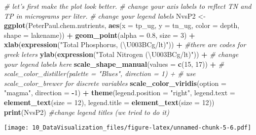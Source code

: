 \documentclass[]{article}
\newenvironment{Shaded}{\begin{snugshade}}{\end{snugshade}}
\newcommand{\KeywordTok}[1]{\textcolor[rgb]{0.13,0.29,0.53}{\textbf{#1}}}
\newcommand{\DataTypeTok}[1]{\textcolor[rgb]{0.13,0.29,0.53}{#1}}
\newcommand{\DecValTok}[1]{\textcolor[rgb]{0.00,0.00,0.81}{#1}}
\newcommand{\FloatTok}[1]{\textcolor[rgb]{0.00,0.00,0.81}{#1}}
\newcommand{\StringTok}[1]{\textcolor[rgb]{0.31,0.60,0.02}{#1}}
\newcommand{\CommentTok}[1]{\textcolor[rgb]{0.56,0.35,0.01}{\textit{#1}}}
\newcommand{\OperatorTok}[1]{\textcolor[rgb]{0.81,0.36,0.00}{\textbf{#1}}}
\newcommand{\NormalTok}[1]{#1}
\begin{document}
\begin{Shaded}
\begin{Highlighting}[]
\CommentTok{# let's first make the plot look better.}
\CommentTok{# change your axis labels to reflect TN and TP in micrograms per liter.}
\CommentTok{# change your legend labels}
\NormalTok{NvsP2 <-}
\StringTok{  }\KeywordTok{ggplot}\NormalTok{(PeterPaul.chem.nutrients, }\KeywordTok{aes}\NormalTok{(}\DataTypeTok{x =}\NormalTok{ tp_ug, }\DataTypeTok{y =}\NormalTok{ tn_ug, }\DataTypeTok{color =}\NormalTok{ depth, }\DataTypeTok{shape =}\NormalTok{ lakename)) }\OperatorTok{+}
\StringTok{  }\KeywordTok{geom_point}\NormalTok{(}\DataTypeTok{alpha =} \FloatTok{0.8}\NormalTok{, }\DataTypeTok{size =} \DecValTok{3}\NormalTok{) }\OperatorTok{+}
\StringTok{  }\KeywordTok{xlab}\NormalTok{(}\KeywordTok{expression}\NormalTok{(}\StringTok{"Total Phosphorus, (\textbackslash{}U003BCg/lt)"}\NormalTok{)) }\OperatorTok{+}\StringTok{ }\CommentTok{#there are codes for greek leters}
\StringTok{  }\KeywordTok{ylab}\NormalTok{(}\KeywordTok{expression}\NormalTok{(}\StringTok{"Total Nitrogen (\textbackslash{}U003BCg/lt)"}\NormalTok{)) }\OperatorTok{+}
\StringTok{  }\CommentTok{# change your legend labels here}
\StringTok{  }\KeywordTok{scale_shape_manual}\NormalTok{(}\DataTypeTok{values =} \KeywordTok{c}\NormalTok{(}\DecValTok{15}\NormalTok{, }\DecValTok{17}\NormalTok{)) }\OperatorTok{+}
\StringTok{ }\CommentTok{# scale_color_distiller(palette = "Blues", direction = 1) + # use scale_color_brewer for discrete variables}
\StringTok{  }\KeywordTok{scale_color_viridis}\NormalTok{(}\DataTypeTok{option =} \StringTok{"magma"}\NormalTok{, }\DataTypeTok{direction =} \OperatorTok{-}\DecValTok{1}\NormalTok{) }\OperatorTok{+}
\StringTok{  }\KeywordTok{theme}\NormalTok{(}\DataTypeTok{legend.position =} \StringTok{"right"}\NormalTok{, }
        \DataTypeTok{legend.text =} \KeywordTok{element_text}\NormalTok{(}\DataTypeTok{size =} \DecValTok{12}\NormalTok{), }\DataTypeTok{legend.title =} \KeywordTok{element_text}\NormalTok{(}\DataTypeTok{size =} \DecValTok{12}\NormalTok{))}
\KeywordTok{print}\NormalTok{(NvsP2)  }\CommentTok{#change legend titles (we tried to do it)}
\end{Highlighting}
\end{Shaded}

\texttt{[image: 10\_DataVisualization\_files/figure-latex/unnamed-chunk-5-6.pdf]}
\end{document}
